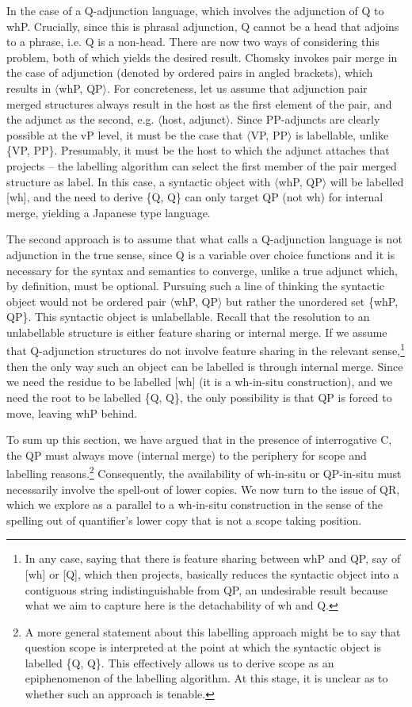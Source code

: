 \documentclass{glossa}
\begin{document}
In the case of a Q-adjunction language, which involves the adjunction of Q to whP. Crucially, since this is phrasal adjunction, Q cannot be a head that adjoins to a phrase, i.e. Q is a non-head. There are now two ways of considering this problem, both of which yields the desired result. Chomsky invokes pair merge in the case of adjunction (denoted by ordered pairs in angled brackets), which results in $\langle$whP, QP$\rangle$. For concreteness, let us assume that adjunction pair merged structures always result in the host as the first element of the pair, and the adjunct as the second, e.g. $\langle$host, adjunct$\rangle$. Since PP-adjuncts are clearly possible at the vP level, it must be the case that $\langle$VP, PP$\rangle$ is labellable, unlike \{VP, PP\}. Presumably, it must be the host to which the adjunct attaches that projects -- the labelling algorithm can select the first member of the pair merged structure as label. In this case, a syntactic object with $\langle$whP, QP$\rangle$ will be labelled [wh], and the need to derive \{Q, Q\} can only target QP (not wh) for internal merge, yielding a Japanese type language.

The second approach is to assume that what \cite{cable:2007} calls a Q-adjunction language is not adjunction in the true sense, since Q is a variable over choice functions and it is necessary for the syntax and semantics to converge, unlike a true adjunct which, by definition, must be optional. Pursuing such a line of thinking the syntactic object would not be ordered pair $\langle$whP, QP$\rangle$ but rather the unordered set \{whP, QP\}. This syntactic object is unlabellable. Recall that the resolution to an unlabellable structure is either feature sharing or internal merge. If we assume that Q-adjunction structures do not involve feature sharing in the relevant sense,\footnote{In any case, saying that there is feature sharing between whP and QP, say of [wh] or [Q], which then projects, basically reduces the syntactic object into a contiguous string indistinguishable from QP, an undesirable result because what we aim to capture here is the detachability of wh and Q.} then the only way such an object can be labelled is through internal merge. Since we need the residue to be labelled [wh] (it is a wh-in-situ construction), and we need the root to be labelled \{Q, Q\}, the only possibility is that QP is forced to move, leaving whP behind.

To sum up this section, we have argued that in the presence of interrogative C, the QP must always move (internal merge) to the periphery for scope and labelling reasons.\footnote{A more general statement about this labelling approach might be to say that question scope is interpreted at the point at which the syntactic object is labelled \{Q, Q\}. This effectively allows us to derive scope as an epiphenomenon of the labelling algorithm. At this stage, it is unclear as to whether such an approach is tenable.} Consequently, the availability of wh-in-situ or QP-in-situ must necessarily involve the spell-out of lower copies. We now turn to the issue of QR, which we explore as a parallel to a wh-in-situ construction in the sense of the spelling out of quantifier's lower copy that is not a scope taking position.
\end{document}
